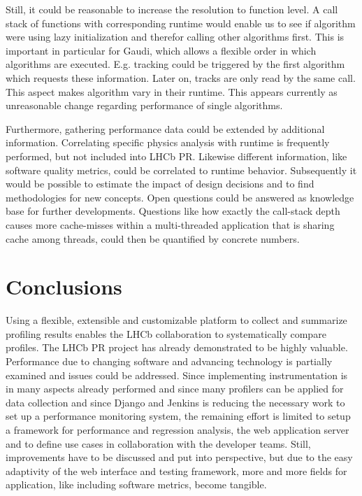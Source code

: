 \documentclass[a4paper]{jpconf}
\begin{document}
Still, it could be reasonable to increase the resolution to function level. A call stack of functions with corresponding runtime would enable us to see if algorithm were using lazy initialization and therefor calling other algorithms first. This is important in particular for Gaudi, which allows a flexible order in which algorithms are executed. E.g. tracking could be triggered by the first algorithm which requests these information. Later on, tracks are only read by the same call. This aspect makes algorithm vary in their runtime. This appears currently as unreasonable change regarding performance of single algorithms.

Furthermore, gathering performance data could be extended by additional information. Correlating specific physics analysis with runtime is frequently performed, but not included into LHCb PR. Likewise different information, like software quality metrics, could be correlated to runtime behavior. Subsequently it would be possible to estimate the impact of design decisions and to find methodologies for new concepts. Open questions could be answered as knowledge base for further developments. Questions like how exactly the call-stack depth causes more cache-misses within a multi-threaded application that is sharing cache among threads, could then be quantified by concrete numbers.

\section{Conclusions}
\label{sec:conclusions}

Using a flexible, extensible and customizable platform to collect and summarize profiling results enables the LHCb collaboration to systematically compare profiles. The LHCb PR project has already demonstrated to be highly valuable. Performance due to changing software and advancing technology is partially examined and issues could be addressed. Since implementing instrumentation is in many aspects already performed and since many profilers can be applied for data collection and since Django and Jenkins is reducing the necessary work to set up a performance monitoring system, the remaining effort is limited to setup a framework for performance and regression analysis, the web application server and to define use cases in collaboration with the developer teams. Still, improvements have to be discussed and put into perspective, but due to the easy adaptivity of the web interface and testing framework, more and more fields for application, like including software metrics, become tangible.
\end{document}
